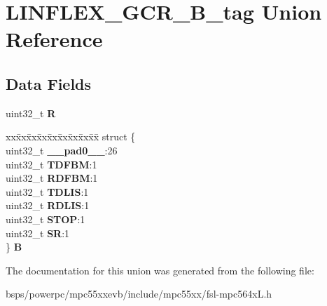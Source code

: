 \hypertarget{unionLINFLEX__GCR__32B__tag}{}\section{L\+I\+N\+F\+L\+E\+X\+\_\+\+G\+C\+R\+\_\+B\+\_\+tag Union Reference}
\label{unionLINFLEX__GCR__32B__tag}
\subsection*{Data Fields}
\begin{DoxyCompactItemize}
\item 
\mbox{\label{unionLINFLEX__GCR__32B__tag_afb5e73bb96acc9d9c42974c4eecfd061}} 
uint32\+\_\+t {\bfseries R}
\item 
\mbox{\label{unionLINFLEX__GCR__32B__tag_a038f18a624e55a3dac98184585b717b5}} 
\begin{tabbing}
xx\=xx\=xx\=xx\=xx\=xx\=xx\=xx\=xx\=\kill
struct \{\\
\>uint32\_t {\bfseries \_\_pad0\_\_}:26\\
\>uint32\_t {\bfseries TDFBM}:1\\
\>uint32\_t {\bfseries RDFBM}:1\\
\>uint32\_t {\bfseries TDLIS}:1\\
\>uint32\_t {\bfseries RDLIS}:1\\
\>uint32\_t {\bfseries STOP}:1\\
\>uint32\_t {\bfseries SR}:1\\
\} {\bfseries B}\\

\end{tabbing}\end{DoxyCompactItemize}


The documentation for this union was generated from the following file\+:\begin{DoxyCompactItemize}
\item 
bsps/powerpc/mpc55xxevb/include/mpc55xx/fsl-\/mpc564x\+L.\+h\end{DoxyCompactItemize}
